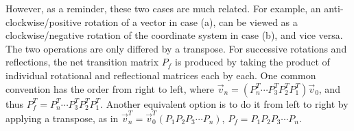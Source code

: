 \par
However, as a reminder, these two cases are much related. For example, an anti-clockwise/positive rotation of a vector in case (a), can be viewed as a clockwise/negative rotation of the coordinate system in case (b), and vice versa. The two operations are only differed by a transpose. For successive rotations and reflections, the net transition matrix $P_f$ is produced by taking the product of individual rotational and reflectional matrices each by each. One common convention has the order from right to left, where $\vec{v}_n = (P_n^T\cdots P_3^TP_2^TP_1^T)\vec{v}_0$, and thus $P_f^T = P_n^T\cdots P_3^TP_2^TP_1^T$. Another equivalent option is to do it from left to right by applying a transpose, as in
$\vec{v}_n^T = \vec{v}_0^T(P_1P_2P_3\cdots P_n)$, $P_f = P_1P_2P_3\cdots P_n$.

